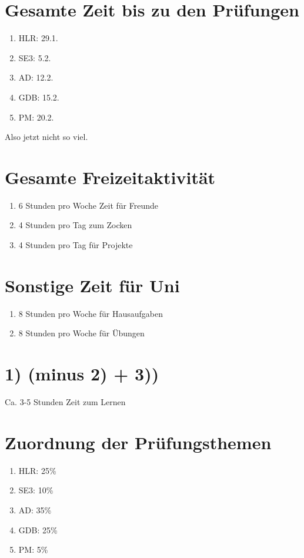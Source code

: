 \documentclass[a4paper,12pt]{scrartcl}
\begin{document}
\section{Gesamte Zeit bis zu den Prüfungen}
\begin{enumerate}
	\item HLR: 29.1.
	\item SE3: 5.2.
	\item AD: 12.2.
	\item GDB: 15.2.
	\item PM: 20.2.
\end{enumerate}

Also jetzt nicht so viel.

\section{Gesamte Freizeitaktivität}
\begin{enumerate}
	\item 6 Stunden pro Woche Zeit für Freunde
	\item 4 Stunden pro Tag zum Zocken
	\item 4 Stunden pro Tag für Projekte
\end{enumerate}

\section{Sonstige Zeit für Uni}
\begin{enumerate}
	\item 8 Stunden pro Woche für Hausaufgaben
	\item 8 Stunden pro Woche für Übungen
\end{enumerate}

\section{1) (minus 2) + 3))}

Ca. 3-5 Stunden Zeit zum Lernen

\section{Zuordnung der Prüfungsthemen}
\begin{enumerate}
	\item HLR: 25\%
	\item SE3: 10\%
	\item AD: 35\%
	\item GDB: 25\%
	\item PM: 5\%
\end{enumerate}
\end{document}
